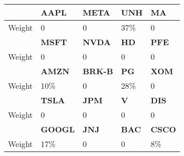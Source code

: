 \documentclass[11pt,en]{elegantpaper}
\begin{document}
\begin{table}[htbp]
    \centering
    \begin{tabular}{|l|l|l|l|l|}
    \hline
           & \textbf{AAPL}  & \textbf{META}  & \textbf{UNH} & \textbf{MA}   \\ \hline
    Weight & 0              & 0              & 37\%         & 0             \\ \hline
           & \textbf{MSFT}  & \textbf{NVDA}  & \textbf{HD}  & \textbf{PFE}  \\ \hline
    Weight & 0              & 0              & 0            & 0             \\ \hline
           & \textbf{AMZN}  & \textbf{BRK-B} & \textbf{PG}  & \textbf{XOM}  \\ \hline
    Weight & 10\%           & 0              & 28\%         & 0             \\ \hline
           & \textbf{TSLA}  & \textbf{JPM}   & \textbf{V}   & \textbf{DIS}  \\ \hline
    Weight & 0              & 0              & 0            & 0             \\ \hline
           & \textbf{GOOGL} & \textbf{JNJ}   & \textbf{BAC} & \textbf{CSCO} \\ \hline
    Weight & 17\%           & 0              & 0            & 8\%          \\ \hline
    \end{tabular}
\end{table}
 
\end{document}

